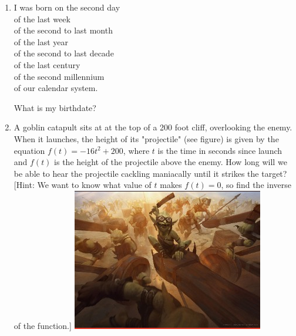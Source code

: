 \documentclass[12pt,letterpaper]{article}
\begin{document}
\begin{enumerate}

\item \mbox{} I was born on the second day\\
\hspace*{.5em} of the last week\\
\hspace*{1em} of the second to last month\\
\hspace*{1.5em}   of the last year\\
\hspace*{2em}    of the second to last decade\\
\hspace*{2.5em}     of the last century\\
\hspace*{3em}      of the second millennium\\
\hspace*{3.5em}       of our calendar system. 

 \mbox{} What is my birthdate?
\vfill


\item A goblin catapult sits at at the top of a 200 foot cliff, overlooking the enemy. When it launches, the height of its "projectile" (see figure) is given by the equation $f(t)=-16t^2+200$, where $t$ is the time in seconds since launch and $f(t)$ is the height of the projectile above the enemy. How long will we be able to hear the projectile cackling maniacally until it strikes the target? [Hint: We want to know what value of $t$ makes $f(t)=0$, so find the inverse of the function.]
\vspace*{-3ex}
\hfill
\includegraphics[width=.3\linewidth,right]{goblin_cannon}
\vspace*{-1.5in}
\vfill


\end{enumerate}
\end{document}
